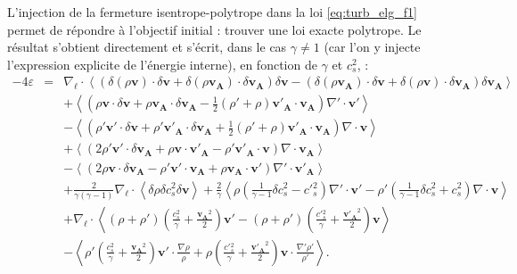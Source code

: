  L'injection de la fermeture isentrope-polytrope dans la loi \eqref{eq:turb_elg_f1} permet de répondre à l'objectif initial : trouver une loi exacte  polytrope. Le résultat s'obtient directement et s'écrit, dans le cas $\gamma \neq 1$ (car l'on y injecte l'expression explicite de l'énergie interne), en fonction de $\gamma$ et $c^2_s$, : 
\begin{equation}
\label{eq:turb_elpol_f1}
\boxed{
\begin{array}{rcl}
-4\varepsilon &=& \nabla_{\boldsymbol{\ell}} \cdot \left<\left(\delta \left(\rho\boldsymbol{v}\right) \cdot \delta \boldsymbol{v}+ \delta \left(\rho\boldsymbol{v_A}\right) \cdot \delta \boldsymbol{v_A} \right)\delta \boldsymbol{v}  -\left(\delta \left(\rho\boldsymbol{v_A}\right) \cdot \delta \boldsymbol{v}  + \delta \left(\rho\boldsymbol{v}\right) \cdot \delta \boldsymbol{v_A}  \right) \delta \boldsymbol{v_A} \right>\\
&& +\left< \left(\rho \boldsymbol{v} \cdot \delta \boldsymbol{v} +\rho \boldsymbol{v_A} \cdot \delta \boldsymbol{v_A} -\frac{1}{2} \left(\rho'+\rho\right) \boldsymbol{v'_A} \cdot \boldsymbol{v_A} \right) \nabla' \cdot \boldsymbol{v'} \right>\\
&& -\left< \left(\rho' \boldsymbol{v'} \cdot \delta \boldsymbol{v} + \rho' \boldsymbol{v'_A} \cdot \delta \boldsymbol{v_A} + \frac{1}{2} \left(\rho'+\rho\right) \boldsymbol{v'_A} \cdot \boldsymbol{v_A}  \right)\nabla \cdot \boldsymbol{v}\right>\\
&&+ \left<\left(2 \rho' \boldsymbol{v'} \cdot \delta \boldsymbol{v_A}+\rho \boldsymbol{v} \cdot \boldsymbol{v'_A} - \rho' \boldsymbol{v'_A} \cdot \boldsymbol{v}  \right)\nabla \cdot \boldsymbol{v_A}\right>\\
&&- \left<\left(2\rho \boldsymbol{v} \cdot \delta \boldsymbol{v_A} -\rho' \boldsymbol{v'} \cdot \boldsymbol{v_A} +  \rho \boldsymbol{v_A} \cdot \boldsymbol{v'} \right)\nabla' \cdot \boldsymbol{v'_A}\right> \\
&&+ \frac{2}{\gamma\left(\gamma-1\right)} \nabla_{\boldsymbol{\ell}} \cdot \left<\delta \rho  \delta c^2_s \delta \boldsymbol{v}\right> + \frac{2}{\gamma} \left<\rho \left(\frac{1}{\gamma-1} \delta c^2_s - c'{}^2_s\right)\nabla' \cdot \boldsymbol{v'}  - \rho' \left(\frac{1}{\gamma-1}\delta c^2_s + c^2_s\right) \nabla \cdot \boldsymbol{v} \right>\\
&&+  \nabla_{\boldsymbol{\ell}} \cdot \left< \left(\rho+\rho'\right) \left(\frac{c^2_s}{\gamma}+\frac{\boldsymbol{v_A}^2}{2}\right) \boldsymbol{v'} -  \left(\rho+\rho'\right) \left(\frac{c'{}^2_s}{\gamma}+\frac{\boldsymbol{v'_A}^2}{2}\right)  \boldsymbol{v} \right>\\
&&- \left<\rho' \left(\frac{c^2_s}{\gamma}+\frac{\boldsymbol{v_A}^2}{2}\right)  \boldsymbol{v'} \cdot \frac{\nabla \rho}{\rho} + \rho \left(\frac{c'{}^2_s}{\gamma}+\frac{\boldsymbol{v'_A}^2}{2}\right)  \boldsymbol{v} \cdot \frac{\nabla' \rho'}{\rho'} \right>.
\end{array}}
\end{equation} 
